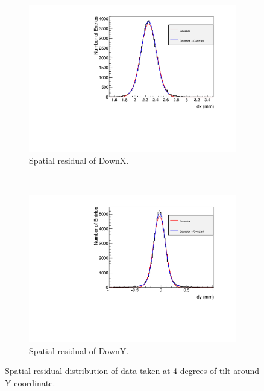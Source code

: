 \documentclass[a4paper,11pt]{article}
\begin{document}
\begin{figure}[h!]
        \centering
         \begin{subfigure}[b]{0.45\textwidth}
   	\includegraphics[keepaspectratio=true, width=\textwidth]{Figures/spatialRes_DownX.pdf}
	\caption{Spatial residual of DownX.}
	\label{dx-X}
        \end{subfigure}
         ~
         \begin{subfigure}[b]{0.45\textwidth}
        \centering
   	\includegraphics[keepaspectratio=true, width=\textwidth]{Figures/spatialRes_DownY.pdf}
	\caption{Spatial residual of DownY.}
                \label{dx-Y}
        \end{subfigure}
         \caption{Spatial residual distribution of data taken at 4 degrees of tilt around Y coordinate.}
        \label{dx}
\end{figure}
\end{document}
